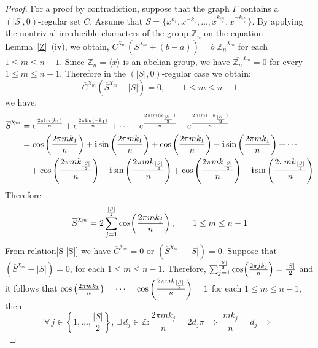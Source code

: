 \documentclass[12pt]{article}
\def\sin{{\rm{sin}}}
\def\cos{{\rm{cos}}}
\begin{document}
	\begin{proof}
		For a proof by contradiction, suppose that the graph $\Gamma$ contains a $(|S|,0)$-regular set $C$. Assume that $S = \{x^{k_1}, x^{-k_1}, \dots, x^{k_{\frac{|S|}{2}}}, x^{-k_{\frac{|S|}{2}}}\}$. By applying the nontrivial irreducible characters of the group $\mathbb{Z}_n$ on the equation Lemma~\ref{Z}~(iv), we obtain, $\overline{C}^{\chi_m} (\overline{S}^{\chi_m}+(b-a))= b\;\overline{\mathbb{Z}_n}^{\chi_m}$ for each  $1 \le m \le n-1$. Since $\mathbb{Z}_n = \langle x \rangle $ is an abelian group, we have $\overline{\mathbb{Z}_n}^{\chi_m} = 0$ for every  $1 \le m \le n-1$. Therefore in the $(|S|,0)$-regular case we obtain:
		\begin{equation}\label{S-|S|}
		\overline{C}^{\chi_m} (\overline{S}^{\chi_m}-|S|)= 0, \qquad 1 \le m \le n-1
		\end{equation}
	we have:
	\[
	\begin{aligned}
		\overline{S}^{\chi_m} &=
		e^{\frac{2 \pi \mathbf{i} m (k_1)}{n}}
		+ e^{\frac{2 \pi \mathbf{i} m (-k_1)}{n}}
		+ \cdots
		+ e^{\frac{2 \pi \mathbf{i} m (k_{\frac{|S|}{2}})}{n}}
		+ e^{\frac{2 \pi \mathbf{i} m (-k_{\frac{|S|}{2}})}{n}} \\
		&=
		\cos\left(\frac{2 \pi m k_1}{n}\right)
		+ \mathbf{i}\,\sin\left(\frac{2 \pi m k_1}{n}\right)
		+ \cos\left(\frac{2 \pi m k_1}{n}\right)
		- \mathbf{i}\,\sin\left(\frac{2 \pi m k_1}{n}\right)
		+ \cdots \\
		&\quad + \cos\left(\frac{2 \pi m k_{\frac{|S|}{2}}}{n}\right)
		+ \mathbf{i}\,\sin\left(\frac{2 \pi m k_{\frac{|S|}{2}}}{n}\right)
		+ \cos\left(\frac{2 \pi m k_{\frac{|S|}{2}}}{n}\right)
		- \mathbf{i}\,\sin\left(\frac{2 \pi m k_{\frac{|S|}{2}}}{n}\right)
	\end{aligned}
	\]	
	Therefore
	\[
	\overline{S}^{\chi_m} = 2	\sum_{j=1}^{\frac{|S|}{2}}
	\cos\!\left(\frac{2\pi m k_j}{n}\right),
	\qquad 1 \le m \le n-1
	\]	
	From relation\eqref{S-|S|} we have $\overline{C}^{\chi_m} = 0$ or  $(\overline{S}^{\chi_m}-|S|) = 0$. Suppose that   $(\overline{S}^{\chi_m}-|S|) = 0$, for each $1 \le m \le n-1$. Therefore, $\sum_{j=1}^{\frac{|S|}{2}}
	\cos\!\left(\frac{2\pi j k_j}{n}\right)
	= \frac{|S|}{2}$ and it follows that $\cos\left(\frac{2\pi m k_1}{n}\right)
	= \cdots
	= \cos\left(\frac{2\pi m k_{\frac{|S|}{2}}}{n}\right)
	= 1$ for each $1 \le m \le n-1$, then
	\[
	\forall\, j \in \left\{1, \ldots, \frac{|S|}{2}\right\},
	\ \exists\, d_j \in \mathbb{Z} :
	\frac{2\pi m k_j}{n} = 2 d_j \pi
	\;\Longrightarrow\;
	\frac{m k_j}{n} = d_j\;\Longrightarrow\
	\]
	\begin{equation}\label{n mid m}

\end{equation}
\end{proof}
\end{document}
